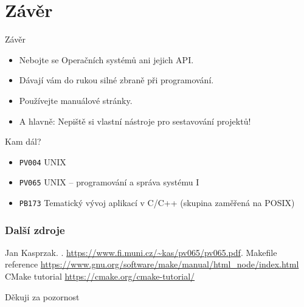 \documentclass[handout]{beamer}
\begin{document}
\section{Závěr}
\begin{frame}{Závěr}
    \begin{itemize}
        \item Nebojte se Operačních systémů ani jejich API.
        \item Dávají vám do rukou silné zbraně při programování.
        \item Používejte manuálové stránky.
        \item A hlavně: Nepiště si vlastní nástroje pro sestavování projektů!
    \end{itemize}
\end{frame}
\begin{frame}{Kam dál?}
    \begin{itemize}
        \item \texttt{PV004} UNIX
        \item \texttt{PV065} UNIX -- programování a správa systému I
        \item \texttt{PB173} Tematický vývoj aplikací v C/C++ (skupina zaměřená na POSIX)
    \end{itemize}
\end{frame}
\begin{frame}
  \frametitle<presentation>{Další zdroje}    
  \begin{thebibliography}{10}    
  \beamertemplatearticlebibitems
    Jan Kasprzak.
    .
    \newblock \url{https://www.fi.muni.cz/~kas/pv065/pv065.pdf}.
  \beamertemplatearticlebibitems
  Makefile reference
  \newblock \url{https://www.gnu.org/software/make/manual/html_node/index.html}
  \beamertemplatearticlebibitems
  CMake tutorial
      \newblock \url{https://cmake.org/cmake-tutorial/}
    \end{thebibliography}
\end{frame}
\begin{frame}
    \huge Děkuji za pozornost
\end{frame}
\end{document}
